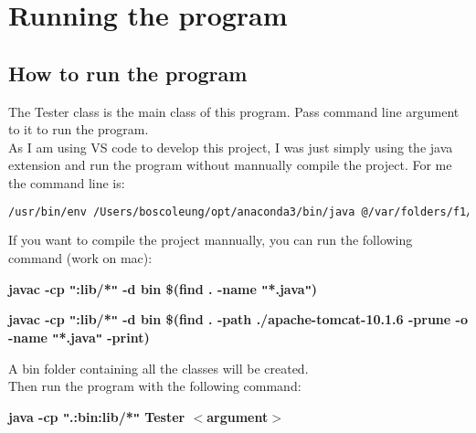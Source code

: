 \documentclass{article}
\begin{document}
    \section*{Running the program}
    \subsection*{How to run the program}
    
        The Tester class is the main class of this program. Pass command line argument to it to run the program. \\[0.4em]
        As I am using VS code to develop this project, I was just simply using the java extension and run the program without mannually compile the project. 
        For me the command line is:
        \begin{lstlisting}[language=bash,breaklines=true]
            /usr/bin/env /Users/boscoleung/opt/anaconda3/bin/java @/var/folders/f1/6mvnwxt109n9rswystbch0t40000gn/T/cp_dh97avm16bvprxybpew6los8v.argfile Tester <argument>
        \end{lstlisting}

        If you want to compile the project mannually, you can run the following command (work on mac):

        \centerline{\textbf{javac -cp \texttt{"}:lib/*\texttt{"} -d bin \$(find . -name \texttt{"}*.java\texttt{"})}} 
        \centerline{\textbf{javac -cp \texttt{"}:lib/*\texttt{"} -d bin \$(find . -path ./apache-tomcat-10.1.6 -prune -o -name \texttt{"}*.java\texttt{"} -print)}}
        A bin folder containing all the classes will be created. \\[0.4em]

        Then run the program with the following command:
    
        \centerline{\textbf{java -cp \texttt{"}.:bin:lib/*\texttt{"} Tester $<$argument$>$}}
\end{document}
